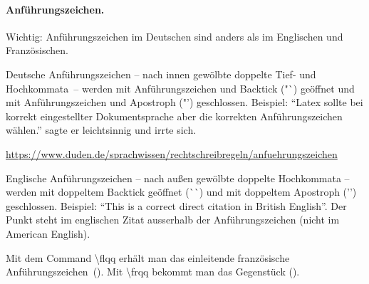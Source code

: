 \paragraph{Anführungszeichen.}
Wichtig: Anführungszeichen im Deutschen sind anders als im Englischen und Französischen. 

Deutsche Anführungszeichen -- nach innen gewölbte doppelte Tief- und Hochkommata~-- werden mit Anführungszeichen und Backtick ("{}\`{}) geöffnet und mit Anführungszeichen und Apostroph ("{}'{}) geschlossen.
Beispiel: 
"`Latex sollte bei korrekt eingestellter Dokumentsprache aber die korrekten Anführungszeichen wählen."' sagte er leichtsinnig und irrte sich.

\url{https://www.duden.de/sprachwissen/rechtschreibregeln/anfuehrungszeichen}

Englische Anführungszeichen -- nach außen gewölbte doppelte Hochkommata -- werden mit doppeltem Backtick geöffnet (\`{}\`{}) und mit doppeltem Apostroph ('{}'{}) geschlossen. Beispiel:
``This is a correct direct citation in British English''. Der Punkt steht im englischen Zitat ausserhalb der Anführungszeichen (nicht im American English).

Mit dem Command \textbackslash flqq erhält man das einleitende französische Anführungszeichen~(\flqq). Mit \textbackslash frqq{} bekommt man das Gegenstück (\frqq).